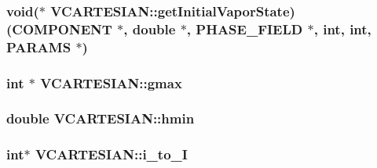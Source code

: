 \subsubsection[{\texorpdfstring{get\+Initial\+Vapor\+State}{getInitialVaporState}}]{\setlength{\rightskip}{0pt plus 5cm}void($\ast$ V\+C\+A\+R\+T\+E\+S\+I\+A\+N\+::get\+Initial\+Vapor\+State) ({\bf C\+O\+M\+P\+O\+N\+E\+NT} $\ast$, double $\ast$, {\bf P\+H\+A\+S\+E\+\_\+\+F\+I\+E\+LD} $\ast$, int, int, {\bf P\+A\+R\+A\+MS} $\ast$)}\hypertarget{class_v_c_a_r_t_e_s_i_a_n_ab04d1c2c863c6000ab0ed44bd794b970}{}\label{class_v_c_a_r_t_e_s_i_a_n_ab04d1c2c863c6000ab0ed44bd794b970}
\subsubsection[{\texorpdfstring{gmax}{gmax}}]{\setlength{\rightskip}{0pt plus 5cm}int $\ast$ V\+C\+A\+R\+T\+E\+S\+I\+A\+N\+::gmax}\hypertarget{class_v_c_a_r_t_e_s_i_a_n_a79ba8a33c59b18b6b4fb166e7bbe7ac2}{}\label{class_v_c_a_r_t_e_s_i_a_n_a79ba8a33c59b18b6b4fb166e7bbe7ac2}
\subsubsection[{\texorpdfstring{hmin}{hmin}}]{\setlength{\rightskip}{0pt plus 5cm}double V\+C\+A\+R\+T\+E\+S\+I\+A\+N\+::hmin}\hypertarget{class_v_c_a_r_t_e_s_i_a_n_ab6011e198e36153b0ebb218dfa8b56cf}{}\label{class_v_c_a_r_t_e_s_i_a_n_ab6011e198e36153b0ebb218dfa8b56cf}
\subsubsection[{\texorpdfstring{i\+\_\+to\+\_\+I}{i_to_I}}]{\setlength{\rightskip}{0pt plus 5cm}int$\ast$ V\+C\+A\+R\+T\+E\+S\+I\+A\+N\+::i\+\_\+to\+\_\+I}\hypertarget{class_v_c_a_r_t_e_s_i_a_n_ab7827da7c051cb56af5d2009cdc4f7e1}{}\label{class_v_c_a_r_t_e_s_i_a_n_ab7827da7c051cb56af5d2009cdc4f7e1}
